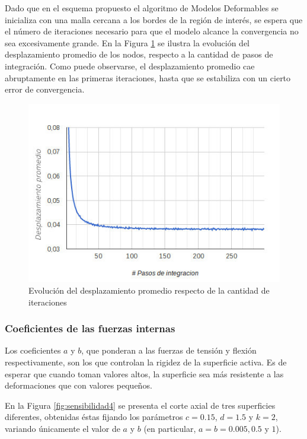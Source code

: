 Dado que en el esquema propuesto el algoritmo de Modelos Deformables se inicializa con una malla cercana a los bordes de la región de interés, se espera que el número de iteraciones necesario para que el modelo alcance la convergencia no sea excesivamente grande. En la Figura \ref{fig:convergencia_snakes} se ilustra la evolución del desplazamiento promedio de los nodos, respecto a la cantidad de pasos de integración. Como puede observarse, el desplazamiento promedio cae abruptamente en las primeras iteraciones, hasta que se estabiliza con un cierto error de convergencia.

\begin{figure}[H]
	\centering
	\includegraphics[scale=0.8]{images/convergencia_snakes.jpg}
	\caption{Evolución del desplazamiento promedio respecto de la cantidad de iteraciones}
	\label{fig:convergencia_snakes}
\end{figure}

\subsubsection{Coeficientes de las fuerzas internas}
Los coeficientes $a$ y $b$, que ponderan a las fuerzas de tensión y flexión respectivamente, son
los que controlan la rigidez de la superficie activa. Es de esperar que cuando toman valores altos, la superficie sea más resistente a las deformaciones que con valores pequeños. 

En la Figura \ref{fig:sensibilidad4} se presenta el corte axial de tres superficies diferentes, obtenidas éstas fijando los parámetros $c=0.15$, $d=1.5$ y $k=2$, variando únicamente el valor de $a$ y $b$ (en particular, $a=b=0.005, 0.5 \text{ y } 1$).

